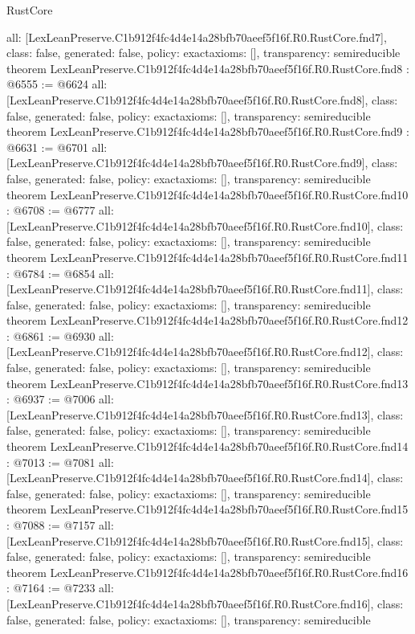 \begin{lexlean}{RustCore}
\begin{coremodule}
{  all: [LexLeanPreserve.C1b912f4fc4d4e14a28bfb70aeef5f16f.R0.RustCore.fnd7],
  class: false,
  generated: false,
  policy: exact{axioms: []},
  transparency: semireducible
}
theorem LexLeanPreserve.C1b912f4fc4d4e14a28bfb70aeef5f16f.R0.RustCore.fnd8 : @6555 := @6624 {
  all: [LexLeanPreserve.C1b912f4fc4d4e14a28bfb70aeef5f16f.R0.RustCore.fnd8],
  class: false,
  generated: false,
  policy: exact{axioms: []},
  transparency: semireducible
}
theorem LexLeanPreserve.C1b912f4fc4d4e14a28bfb70aeef5f16f.R0.RustCore.fnd9 : @6631 := @6701 {
  all: [LexLeanPreserve.C1b912f4fc4d4e14a28bfb70aeef5f16f.R0.RustCore.fnd9],
  class: false,
  generated: false,
  policy: exact{axioms: []},
  transparency: semireducible
}
theorem LexLeanPreserve.C1b912f4fc4d4e14a28bfb70aeef5f16f.R0.RustCore.fnd10 : @6708 := @6777 {
  all: [LexLeanPreserve.C1b912f4fc4d4e14a28bfb70aeef5f16f.R0.RustCore.fnd10],
  class: false,
  generated: false,
  policy: exact{axioms: []},
  transparency: semireducible
}
theorem LexLeanPreserve.C1b912f4fc4d4e14a28bfb70aeef5f16f.R0.RustCore.fnd11 : @6784 := @6854 {
  all: [LexLeanPreserve.C1b912f4fc4d4e14a28bfb70aeef5f16f.R0.RustCore.fnd11],
  class: false,
  generated: false,
  policy: exact{axioms: []},
  transparency: semireducible
}
theorem LexLeanPreserve.C1b912f4fc4d4e14a28bfb70aeef5f16f.R0.RustCore.fnd12 : @6861 := @6930 {
  all: [LexLeanPreserve.C1b912f4fc4d4e14a28bfb70aeef5f16f.R0.RustCore.fnd12],
  class: false,
  generated: false,
  policy: exact{axioms: []},
  transparency: semireducible
}
theorem LexLeanPreserve.C1b912f4fc4d4e14a28bfb70aeef5f16f.R0.RustCore.fnd13 : @6937 := @7006 {
  all: [LexLeanPreserve.C1b912f4fc4d4e14a28bfb70aeef5f16f.R0.RustCore.fnd13],
  class: false,
  generated: false,
  policy: exact{axioms: []},
  transparency: semireducible
}
theorem LexLeanPreserve.C1b912f4fc4d4e14a28bfb70aeef5f16f.R0.RustCore.fnd14 : @7013 := @7081 {
  all: [LexLeanPreserve.C1b912f4fc4d4e14a28bfb70aeef5f16f.R0.RustCore.fnd14],
  class: false,
  generated: false,
  policy: exact{axioms: []},
  transparency: semireducible
}
theorem LexLeanPreserve.C1b912f4fc4d4e14a28bfb70aeef5f16f.R0.RustCore.fnd15 : @7088 := @7157 {
  all: [LexLeanPreserve.C1b912f4fc4d4e14a28bfb70aeef5f16f.R0.RustCore.fnd15],
  class: false,
  generated: false,
  policy: exact{axioms: []},
  transparency: semireducible
}
theorem LexLeanPreserve.C1b912f4fc4d4e14a28bfb70aeef5f16f.R0.RustCore.fnd16 : @7164 := @7233 {
  all: [LexLeanPreserve.C1b912f4fc4d4e14a28bfb70aeef5f16f.R0.RustCore.fnd16],
  class: false,
  generated: false,
  policy: exact{axioms: []},
  transparency: semireducible
}

\end{coremodule}
\end{lexlean}
